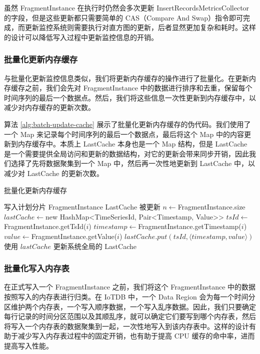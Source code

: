 虽然 FragmentInstance 在执行时仍然会多次更新 InsertRecordsMetricsCollector 的字段，但是这些更新都只需要简单的 CAS（Compare And Swap）指令即可完成，而更新监控系统则需要执行对直方图的更新，后者显然更加复杂和耗时。这样的设计可以降低写入过程中更新监控信息的开销。
\subsubsection{批量化更新内存缓存}
与批量化更新监控信息类似，我们将更新内存缓存的操作进行了批量化。在更新内存缓存之前，我们会先对 FragmentInstance 中的数据进行排序和去重，保留每个时间序列的最后一个数据点。然后，我们将这些信息一次性更新到内存缓存中，以减少对内存缓存的更新次数。

算法 \ref{alg:batch-update-cache} 展示了批量化更新内存缓存的伪代码。我们使用了一个 Map 来记录每个时间序列的最后一个数据点，最后将这个 Map 中的内容更新到内存缓存中。本质上 LastCache 本身也是一个 Map 结构，但是 LastCache 是一个需要提供全局访问和更新的数据结构，对它的更新会带来同步开销，因此我们选择了先将数据聚集到一个 Map 中，然后再一次性地更新到 LastCache 中，以减少对 LastCache 的更新次数。
\begin{algorithm}
  \caption{批量化更新内存缓存}
  \label{alg:batch-update-cache}
  \small
  \begin{algorithmic}
    \REQUIRE 写入计划分片 FragmentInstance
    \ENSURE LastCache 被更新
    \STATE $n \leftarrow $FragmentInstance.size
    \STATE $lastCache \leftarrow $new HashMap<TimeSeriesId, Pair<Timestamp, Value>>
    \STATE $tsId \leftarrow $FragmentInstance.getTsId($i$)
    \STATE $timestamp \leftarrow $FragmentInstance.getTimestamp($i$)
    \STATE $value \leftarrow $FragmentInstance.getValue($i$)
    \STATE $lastCache.put(tsId, \langle timestamp, value \rangle)$
    \ENDIF
    \ENDFOR
    \STATE 使用 $lastCache$ 更新系统全局的 LastCache
  \end{algorithmic}
\end{algorithm}
\subsubsection{批量化写入内存表}
在正式写入一个 FragmentInstance 之前，我们将这个 FragmentInstance 中的数据按照写入的内存表进行归类。在 IoTDB 中，一个 Data Region 会为每一个时间分区维护两个内存表，一个写入顺序数据，一个写入乱序数据。因此，我们只要确定每行记录的时间分区范围以及其顺乱序，就可以确定它们要写到哪个内存表，然后将写入一个内存表的数据聚集到一起，一次性地写入到该内存表中。这样的设计有助于减少写入内存表过程中的固定开销，也有助于提高 CPU 缓存的命中率，进而提高写入性能。
